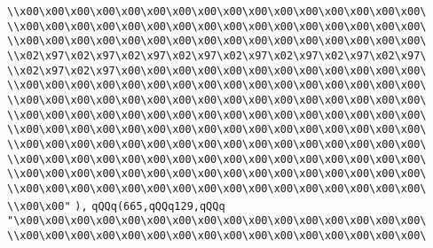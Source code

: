 \verb|\\x00\x00\x00\x00\x00\x00\x00\x00\x00\x00\x00\x00\x00\x00\x00\x00\|\newline
\verb|\\x00\x00\x00\x00\x00\x00\x00\x00\x00\x00\x00\x00\x00\x00\x00\x00\|\newline
\verb|\\x00\x00\x00\x00\x00\x00\x00\x00\x00\x00\x00\x00\x00\x00\x00\x00\|\newline
\verb|\\x02\x97\x02\x97\x02\x97\x02\x97\x02\x97\x02\x97\x02\x97\x02\x97\|\newline
\verb|\\x02\x97\x02\x97\x00\x00\x00\x00\x00\x00\x00\x00\x00\x00\x00\x00\|\newline
\verb|\\x00\x00\x00\x00\x00\x00\x00\x00\x00\x00\x00\x00\x00\x00\x00\x00\|\newline
\verb|\\x00\x00\x00\x00\x00\x00\x00\x00\x00\x00\x00\x00\x00\x00\x00\x00\|\newline
\verb|\\x00\x00\x00\x00\x00\x00\x00\x00\x00\x00\x00\x00\x00\x00\x00\x00\|\newline
\verb|\\x00\x00\x00\x00\x00\x00\x00\x00\x00\x00\x00\x00\x00\x00\x00\x00\|\newline
\verb|\\x00\x00\x00\x00\x00\x00\x00\x00\x00\x00\x00\x00\x00\x00\x00\x00\|\newline
\verb|\\x00\x00\x00\x00\x00\x00\x00\x00\x00\x00\x00\x00\x00\x00\x00\x00\|\newline
\verb|\\x00\x00\x00\x00\x00\x00\x00\x00\x00\x00\x00\x00\x00\x00\x00\x00\|\newline
\verb|\\x00\x00\x00\x00\x00\x00\x00\x00\x00\x00\x00\x00\x00\x00\x00\x00\|\newline
\verb|\\x00\x00"|\newline
\verb|),|\newline
\verb|qQQq(665,qQQq129,qQQq|\newline
\verb|"\x00\x00\x00\x00\x00\x00\x00\x00\x00\x00\x00\x00\x00\x00\x00\x00\|\newline
\verb|\\x00\x00\x00\x00\x00\x00\x00\x00\x00\x00\x00\x00\x00\x00\x00\x00\|\newline
